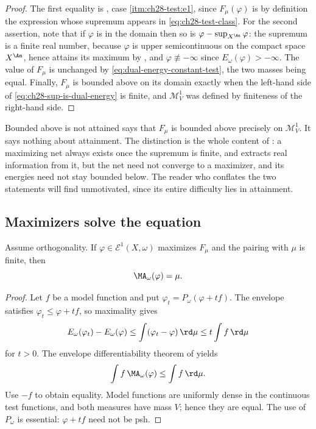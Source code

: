 \begin{proof}
The first equality is , case
\cref{itm:ch28-test:e1}, since $F_\mu(\varphi)$ is by definition the
expression whose supremum appears in \eqref{eq:ch28-test-class}.  For the
second assertion, note that if $\varphi$ is in the domain then so is
$\varphi-\sup_{X^{\An}}\varphi$: the supremum is a finite real number,
because $\varphi$ is upper semicontinuous on the compact space
$X^{\An}$, hence attains its maximum by , and
$\varphi\not\equiv-\infty$ since $E_\omega(\varphi)>-\infty$.  The value
of $F_\mu$ is unchanged by \eqref{eq:dual-energy-constant-test}, the two
masses being equal.  Finally, $F_\mu$ is bounded above on its domain
exactly when the left-hand side of \eqref{eq:ch28-sup-is-dual-energy} is
finite, and $\mathcal M^1_V$ was defined by finiteness of the right-hand
side.
\end{proof}

\begin{warning}{Bounded above is not attained}
 says that $F_\mu$ is bounded above
precisely on $\mathcal M^1_V$.  It says nothing about attainment.  The
distinction is the whole content of : a maximizing
net always exists once the supremum is finite, and
 extracts real information from
it, but the net need not converge to a maximizer, and its energies need not
stay bounded below.  The reader who conflates the two statements will find
 unmotivated, since its entire difficulty lies in
attainment.
\end{warning}

\subsection{Maximizers solve the equation}
\label{sec:ch28-maximizers-solve}

\begin{proposition}
\label{prop:variational-maximizer-solves}
Assume orthogonality.  If $\varphi\in\mathcal E^1(X,\omega)$ maximizes
$F_\mu$ and the pairing with $\mu$ is finite, then
\begin{equation}
\label{eq:variational-ma-equation}
                         \MA_\omega(\varphi)=\mu.
\end{equation}
\end{proposition}

\begin{proof}
Let $f$ be a model function and put
$\varphi_t=P_\omega(\varphi+tf)$.  The envelope satisfies
$\varphi_t\leq\varphi+tf$, so maximality gives
\[
 E_\omega(\varphi_t)-E_\omega(\varphi)
 \leq\int(\varphi_t-\varphi)\,\rd \mu
 \leq t\int f\,\rd \mu
\]
for $t>0$.  The envelope differentiability theorem of
 yields
\[
                    \int f\,\MA_\omega(\varphi)
                    \leq\int f\,\rd \mu.
\]
Use $-f$ to obtain equality.  Model functions are uniformly dense in the
continuous test functions, and both measures have mass $V$; hence they
are equal.  The use of $P_\omega$ is essential: $\varphi+tf$ need not
be psh.
\end{proof}

